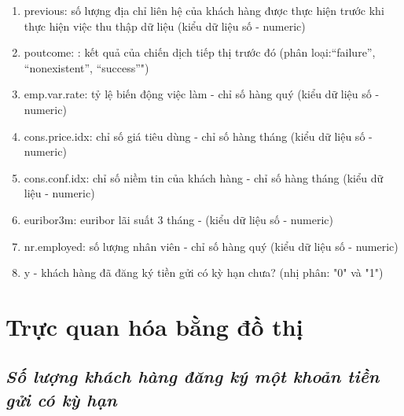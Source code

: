 \documentclass{report}
\begin{document}
\begin{enumerate}
        \item previous: số lượng địa chỉ liên hệ của khách hàng được thực hiện trước khi thực hiện việc thu thập dữ liệu (kiểu dữ liệu số - numeric)
        \item poutcome: : kết quả của chiến dịch tiếp thị trước đó (phân loại:“failure”, “nonexistent”, “success”")
        \item emp.var.rate: tỷ lệ biến động việc làm - chỉ số hàng quý (kiểu dữ liệu số - numeric)
        \item cons.price.idx: chỉ số giá tiêu dùng - chỉ số hàng tháng (kiểu dữ liệu số - numeric)     
        \item cons.conf.idx:  chỉ số niềm tin của khách hàng - chỉ số hàng tháng (kiểu dữ liệu - numeric)     
        \item euribor3m: euribor lãi suất 3 tháng - (kiểu dữ liệu số - numeric)
        \item nr.employed: số lượng nhân viên - chỉ số hàng quý (kiểu dữ liệu số - numeric)
        \item y - khách hàng đã đăng ký tiền gửi có kỳ hạn chưa? (nhị phân: "0" và "1")
    \end{enumerate}

\fontsize{14}{10}\selectfont
\section{Trực quan hóa bằng đồ thị}
\subsection{\textit{Số lượng khách hàng đăng ký một khoản tiền gửi có kỳ hạn}}
\end{document}

